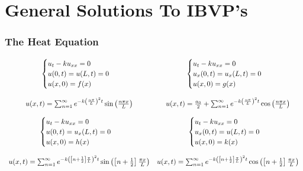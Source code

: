 \documentclass{article}
\begin{document}
\section*{General Solutions To IBVP's}
\subsubsection*{The Heat Equation}
\[
\begin{array}{c c}
\begin{cases}
u_{t} - ku_{xx} = 0\\
u(0,t) = u(L,t) = 0\\
u(x,0) = f(x)
\end{cases}
&
\begin{cases}
u_{t} - ku_{xx} = 0\\
u_{x}(0,t) = u_{x}(L,t) = 0\\
u(x,0) = g(x)
\end{cases}\\
&\\
u(x,t) = \sum_{n=1}^{\infty}e^{-k\left(\frac{n\pi}{L}\right)^{2}t}\sin{\left(\frac{n\pi x}{L}\right)}
& u(x,t) = \frac{a_{0}}{2} + \sum_{n=1}^{\infty}e^{-k\left(\frac{n\pi}{L}\right)^{2}t}\cos{\left(\frac{n\pi x}{L}\right)}\\
&\\
\begin{cases}
u_{t} - ku_{xx} = 0\\
u(0,t) = u_{x}(L,t) = 0\\
u(x,0) = h(x)
\end{cases}
&
\begin{cases}
u_{t} - ku_{xx} = 0\\
u_{x}(0,t) = u(L,t) = 0\\
u(x,0) = k(x)
\end{cases}\\
&\\
u(x,t) =  \sum_{n=1}^{\infty}e^{-k\left(\left[n + \frac{1}{2}\right]\frac{\pi}{L}\right)^{2}t}\sin{\left(\left[n + \frac{1}{2}\right]\frac{\pi x}{L}\right)}
& u(x,t) =  \sum_{n=1}^{\infty}e^{-k\left(\left[n + \frac{1}{2}\right]\frac{\pi}{L}\right)^{2}t}\cos{\left(\left[n + \frac{1}{2}\right]\frac{\pi x}{L}\right)}
\end{array}
\]
\noindent\\
\end{document}

